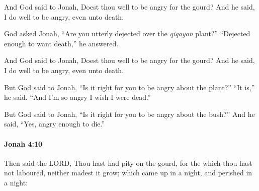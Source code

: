 			And God said to Jonah, Doest thou well to be angry for the gourd? And he said, I do well to be angry, even unto death.

			\begin{versebox}
					\item[BHS] 
					\item[LXX] 
					\item[AB 1990 300] God asked Jonah, ``Are you utterly dejected over the \textit{qiqayon} plant?'' ``Dejected enough to want death,'' he answered.
					\item[ASV] And God said to Jonah, Doest thou well to be angry for the gourd? And he said, I do well to be angry, even unto death.
					\item[NIV] But God said to Jonah, “Is it right for you to be angry about the plant?” “It is,” he said. “And I’m so angry I wish I were dead.”
					\item[NRSV] But God said to Jonah, “Is it right for you to be angry about the bush?” And he said, “Yes, angry enough to die.”
			\end{versebox}

		\paragraph{Jonah 4:10} %
			\label{JONAH-4-10}

			Then said the LORD, Thou hast had pity on the gourd, for the which thou hast not laboured, neither madest it grow; which came up in a night, and perished in a night:

